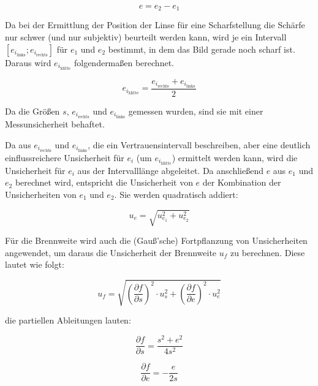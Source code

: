 \documentclass[a4paper,12pt]{article}
\begin{document}
\begin{equation}
    \label{eq:BesselAbstand}
    e = e_2 - e_1
\end{equation}

Da bei der Ermittlung der Position der Linse für eine Scharfstellung die Schärfe nur schwer (und nur subjektiv)
beurteilt werden kann, wird je ein Intervall $[e_{i_\mathrm{links}};e_{i_\mathrm{rechts}}]$ für $e_1$ und
$e_2$ bestimmt, in dem das Bild gerade noch scharf ist. Daraus wird $e_{i_\mathrm{Mitte}}$ folgendermaßen berechnet.

\begin{equation}
    \label{eq:BesselAbstandIntervall}
    e_{i_\mathrm{Mitte}} = \frac{e_{i_\mathrm{rechts}} + e_{i_\mathrm{links}}}{2}
\end{equation}

Da die Größen $s$, $e_{i_\mathrm{rechts}}$ und $e_{i_\mathrm{links}}$ gemessen wurden, sind sie mit einer
Messunsicherheit behaftet. 

Da aus $e_{i_\mathrm{rechts}}$ und $e_{i_\mathrm{links}}$, die ein Vertrauensintervall beschreiben, aber eine
deutlich einflussreichere Unsicherheit für $e_i$ (um $e_{i_\mathrm{Mitte}}$) ermittelt werden kann, wird die Unsicherheit
für $e_i$ aus der Intervalllänge abgeleitet.
Da anschließend $e$ aus $e_1$ und $e_2$ berechnet wird, entspricht die Unsicherheit von $e$ der Kombination der
Unsicherheiten von $e_1$ und $e_2$.
Sie werden quadratisch addiert:


\begin{equation}
    \label{eq:UnkorrUnsFortpfl}
    u_e=\sqrt{u_{e_1}^2+u_{e_2}^2}
\end{equation}

Für die Brennweite wird auch die (Gauß'sche) Fortpflanzung von Unsicherheiten angewendet,
um daraus die Unsicherheit der Brennweite $u_f$ zu berechnen. Diese lautet wie folgt:

\begin{equation}
    \label{eq:GaussUnsFortpfl}
    u_f = \sqrt{\left(\frac{\partial f}{\partial s}\right)^2 \cdot u_s^2 + \left(\frac{\partial f}{\partial e}\right)^2 \cdot u_e^2}
\end{equation}

die partiellen Ableitungen lauten:

\begin{equation}
    \frac{\partial f}{\partial s} = \frac{s^2+e^2}{4s^2}
\end{equation}

\begin{equation}
    \frac{\partial f}{\partial e} = -\frac{e}{2s}
\end{equation}
\end{document}
